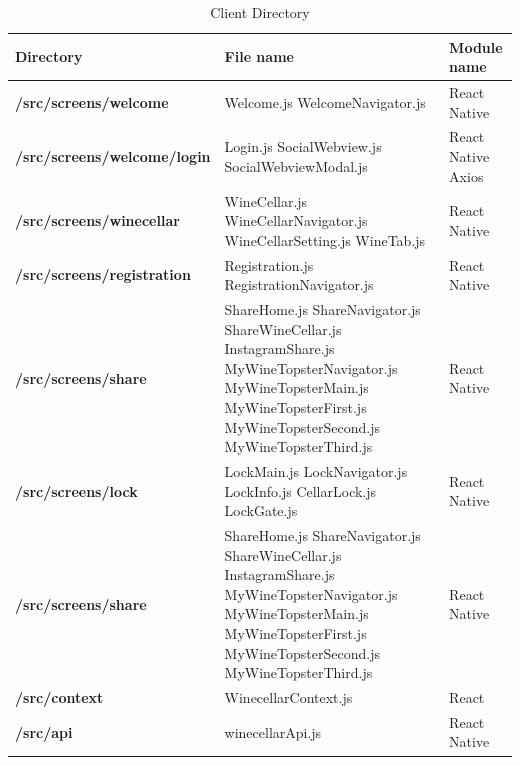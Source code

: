 \documentclass[conference]{IEEEtran}
\numberwithin{figure}{subsection}
\begin{document}
\begin{table}[htbp!]
    \caption{Client Directory}
    \begin{center}
        \begin{tabular}{ | m{3cm} | m{2cm}| m{1.5cm} | } 
          \hline
         \textbf{Directory}& \textbf{File name} & \textbf{Module name} \\
        \hline
          \textbf{/src/screens/welcome} & Welcome.js
        WelcomeNavigator.js
         & React Native \\
          \hline
          \textbf{/src/screens/welcome/login} & Login.js
        SocialWebview.js
        SocialWebviewModal.js
         & React Native Axios  \\ 
          \hline
          \textbf{/src/screens/winecellar} & WineCellar.js
        WineCellarNavigator.js
        WineCellarSetting.js
        WineTab.js
         & React Native\\
          \hline
         \textbf{/src/screens/registration}& Registration.js
        RegistrationNavigator.js
        & React Native \\
        \hline
          \textbf{/src/screens/share} & ShareHome.js
        ShareNavigator.js
        ShareWineCellar.js
        InstagramShare.js
        MyWineTopsterNavigator.js
        MyWineTopsterMain.js
        MyWineTopsterFirst.js
        MyWineTopsterSecond.js
        MyWineTopsterThird.js
         & React Native \\
          \hline
          \textbf{/src/screens/lock} & LockMain.js
        LockNavigator.js
        LockInfo.js
        CellarLock.js  LockGate.js
         & React Native\\
          \hline
            \textbf{/src/screens/share} & ShareHome.js
        ShareNavigator.js
        ShareWineCellar.js
        InstagramShare.js
        MyWineTopsterNavigator.js
        MyWineTopsterMain.js
        MyWineTopsterFirst.js
        MyWineTopsterSecond.js
        MyWineTopsterThird.js
         & React Native \\
          \hline
          \textbf{/src/context} & WinecellarContext.js
         & React \\ 
          \hline
          \textbf{/src/api} & winecellarApi.js
         & React Native\\
          \hline
        \end{tabular}
    \end{center}
\end{table}
\end{document}
